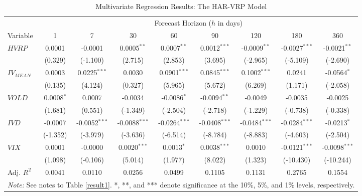 \documentclass[a4paper, 12pt]{article}    %
\begin{document}
\begin{table}[htbp]
\centering
\footnotesize
\setlength{\tabcolsep}{3.2pt} 
\caption{Multivariate Regression Results: The HAR-VRP Model}
\label{HARRESULT2}
\renewcommand{\arraystretch}{1.2}
\begin{tabular*}{\textwidth}{@{\extracolsep{\fill}}lcccccccc}
\toprule
 & \multicolumn{8}{c}{Forecast Horizon ($h$ in days)} \\
\cmidrule(lr){2-9}
Variable & 1 & 7 & 30 & 60 & 90 & 120 & 180 & 360 \\
\midrule
$HVRP$ & 0.0001 & -0.0001 & 0.0005$^{**}$ & 0.0007$^{**}$ & 0.0012$^{***}$ & -0.0009$^{**}$ & -0.0027$^{***}$ & -0.0021$^{**}$ \\
 & (0.329) & (-1.100) & (2.715) & (2.853) & (3.695) & (-2.965) & (-5.109) & (-2.690) \\
\addlinespace
$IV_{MEAN}$ & 0.0003 & 0.0225$^{***}$ & 0.0030 & 0.0901$^{***}$ & 0.0845$^{***}$ & 0.1002$^{***}$ & 0.0241 & -0.0564$^{*}$ \\
 & (0.135) & (4.124) & (0.327) & (5.965) & (5.672) & (6.269) & (1.171) & (-2.058) \\
\addlinespace
$VOLD$ & 0.0008$^{*}$ & 0.0007 & -0.0034 & -0.0086$^{*}$ & -0.0094$^{**}$ & -0.0049 & -0.0035 & -0.0025 \\
 & (1.681) & (0.551) & (-1.349) & (-2.504) & (-2.718) & (-1.229) & (-0.738) & (-0.338) \\
\addlinespace
$IVD$ & -0.0007 & -0.0052$^{***}$ & -0.0088$^{***}$ & -0.0264$^{***}$ & -0.0408$^{***}$ & -0.0484$^{***}$ & -0.0284$^{***}$ & -0.0213$^{*}$ \\
 & (-1.352) & (-3.979) & (-3.636) & (-6.514) & (-8.784) & (-8.883) & (-4.603) & (-2.504) \\
\addlinespace
$VIX$ & 0.0001 & -0.0000 & 0.0020$^{***}$ & 0.0013$^{*}$ & 0.0038$^{***}$ & 0.0010 & -0.0121$^{***}$ & -0.0098$^{***}$ \\
 & (1.098) & (-0.106) & (5.014) & (1.977) & (8.022) & (1.323) & (-10.430) & (-10.244) \\
\midrule
Adj. $R^2$ & 0.0041 & 0.0110 & 0.0256 & 0.0499 & 0.1105 & 0.1131 & 0.2765 & 0.1554 \\
\bottomrule
\multicolumn{9}{l}{\scriptsize \textit{Note:} See notes to Table \ref{result1}. *, **, and *** denote significance at the 10\%, 5\%, and 1\% levels, respectively.} \\
\end{tabular*}
\end{table}
\end{document}
